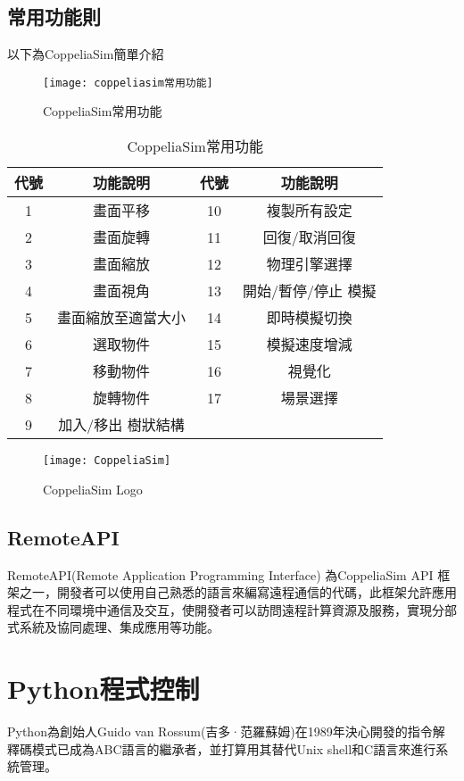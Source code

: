 \subsection{常用功能則}
以下為CoppeliaSim簡單介紹

\begin{figure}[hbt!]
\center
\texttt{[image: coppeliasim常用功能]}
\caption{\Large CoppeliaSim常用功能}
\label{coppeliasim常用功能}
\end{figure}

\begin{table}[htbp]
  \centering
  \large
  \setlength{\tabcolsep}{0.7cm}
  \begin{tabular}{|c|c|c|c|}
    \hline
    代號 & 功能說明 & 代號 & 功能說明 \\
    \hline
    1 & 畫面平移 & 10 & 複製所有設定 \\
    \hline
    2 & 畫面旋轉 & 11 & 回復/取消回復 \\
    \hline
    3 & 畫面縮放 & 12 & 物理引擎選擇 \\
    \hline
    4 & 畫面視角 & 13 & 開始/暫停/停止 模擬 \\
    \hline
    5 & 畫面縮放至適當大小 & 14 & 即時模擬切換 \\
    \hline
    6 & 選取物件 & 15 & 模擬速度增減 \\
    \hline
    7 & 移動物件 & 16 & 視覺化 \\
    \hline
    8 & 旋轉物件 & 17 & 場景選擇 \\
    \hline
    9 & 加入/移出 樹狀結構 & & \\
    \hline
  \end{tabular}
  \caption{\Large CoppeliaSim常用功能}
\end{table}

\begin{figure}[hbt!]
\center
\texttt{[image: CoppeliaSim]}
\caption{\Large CoppeliaSim Logo}
\end{figure}

\subsection{RemoteAPI}
RemoteAPI(Remote Application Programming Interface) 為CoppeliaSim API 框架之一，開發者可以使用自己熟悉的語言來編寫遠程通信的代碼，此框架允許應用程式在不同環境中通信及交互，使開發者可以訪問遠程計算資源及服務，實現分部式系統及協同處理、集成應用等功能。\\

\section{Python程式控制}
Python為創始人Guido van Rossum(吉多·范羅蘇姆)在1989年決心開發的指令解釋碼模式已成為ABC語言的繼承者，並打算用其替代Unix shell和C語言來進行系統管理。\\


